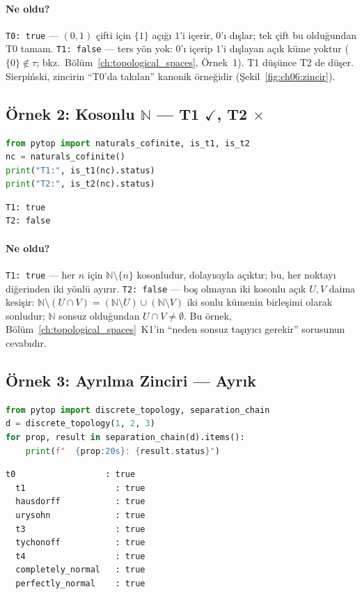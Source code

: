 \paragraph{Ne oldu?}
\texttt{T0: true} --- $(0,1)$ çifti için $\{1\}$ açığı $1$'i içerir,
$0$'ı dışlar; tek çift bu olduğundan T0 tamam. \texttt{T1: false} ---
ters yön yok: $0$'ı içerip $1$'i dışlayan açık küme yoktur
($\{0\}\notin\tau$; bkz.\ Bölüm~\ref{ch:topological_spaces},
Örnek~1). T1 düşünce T2 de düşer. Sierpiński, zincirin ``T0'da
takılan'' kanonik örneğidir (Şekil~\ref{fig:ch06:zincir}).

\subsection{Örnek 2: Kosonlu $\mathbb{N}$ — T1 $\checkmark$, T2 $\times$}

\begin{lstlisting}[language=Python]
from pytop import naturals_cofinite, is_t1, is_t2
nc = naturals_cofinite()
print("T1:", is_t1(nc).status)
print("T2:", is_t2(nc).status)
\end{lstlisting}
\begin{lstlisting}[caption={Çıktı}]
T1: true
T2: false
\end{lstlisting}

\paragraph{Ne oldu?}
\texttt{T1: true} --- her $n$ için $\mathbb{N}\setminus\{n\}$
kosonludur, dolayısıyla açıktır; bu, her noktayı diğerinden iki yönlü
ayırır. \texttt{T2: false} --- boş olmayan iki kosonlu açık $U,V$
daima kesişir: $\mathbb{N}\setminus(U\cap V)=
(\mathbb{N}\setminus U)\cup(\mathbb{N}\setminus V)$ iki sonlu kümenin
birleşimi olarak sonludur; $\mathbb{N}$ sonsuz olduğundan
$U\cap V\neq\emptyset$. Bu örnek,
Bölüm~\ref{ch:topological_spaces}~K1'in ``neden sonsuz taşıyıcı
gerekir'' sorusunun cevabıdır.

\subsection{Örnek 3: Ayrılma Zinciri — Ayrık}

\begin{lstlisting}[language=Python]
from pytop import discrete_topology, separation_chain
d = discrete_topology(1, 2, 3)
for prop, result in separation_chain(d).items():
    print(f"  {prop:20s}: {result.status}")
\end{lstlisting}
\begin{lstlisting}[style=output, caption={Çıktı}]
  t0                  : true
  t1                  : true
  hausdorff           : true
  urysohn             : true
  t3                  : true
  tychonoff           : true
  t4                  : true
  completely_normal   : true
  perfectly_normal    : true
\end{lstlisting}


